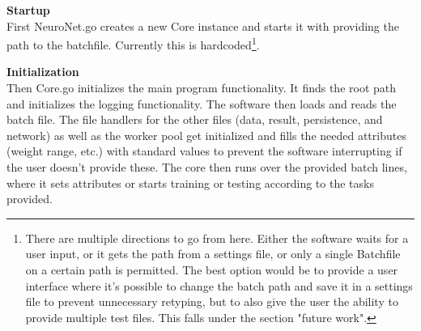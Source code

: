 \documentclass[11pt]{article}
\begin{document}
\textbf{Startup}\\
First NeuroNet.go creates a new Core instance and starts it with providing the path to the batchfile. Currently this is hardcoded\footnote{There are multiple directions to go from here. Either the software waits for a user input, or it gets the path from a settings file, or only a single Batchfile on a certain path is permitted. The best option would be to provide a user interface where it's possible to change the batch path and save it in a settings file to prevent unnecessary retyping, but to also give the user the ability to provide multiple test files. This falls under the section "future work".}.

\textbf{Initialization}\\
Then Core.go initializes the main program functionality. It finds the root path and initializes the logging functionality. The software then loads and reads the batch file. The file handlers for the other files (data, result, persistence, and network) as well as the worker pool get initialized and fills the needed attributes (weight range, etc.) with standard values to prevent the software interrupting if the user doesn't provide these. The core then runs over the provided batch lines, where it sets attributes or starts training or testing according to the tasks provided.
\end{document}

